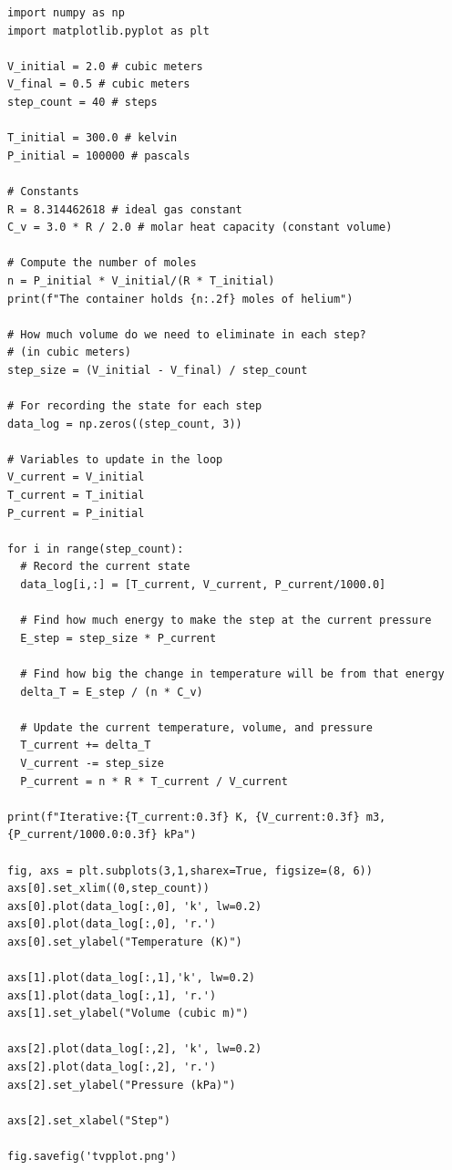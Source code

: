 \begin{verbatim}
import numpy as np
import matplotlib.pyplot as plt

V_initial = 2.0 # cubic meters
V_final = 0.5 # cubic meters
step_count = 40 # steps

T_initial = 300.0 # kelvin
P_initial = 100000 # pascals

# Constants
R = 8.314462618 # ideal gas constant
C_v = 3.0 * R / 2.0 # molar heat capacity (constant volume)

# Compute the number of moles
n = P_initial * V_initial/(R * T_initial) 
print(f"The container holds {n:.2f} moles of helium")

# How much volume do we need to eliminate in each step? 
# (in cubic meters)
step_size = (V_initial - V_final) / step_count

# For recording the state for each step
data_log = np.zeros((step_count, 3))

# Variables to update in the loop
V_current = V_initial
T_current = T_initial
P_current = P_initial

for i in range(step_count):
  # Record the current state
  data_log[i,:] = [T_current, V_current, P_current/1000.0]

  # Find how much energy to make the step at the current pressure
  E_step = step_size * P_current

  # Find how big the change in temperature will be from that energy
  delta_T = E_step / (n * C_v)

  # Update the current temperature, volume, and pressure
  T_current += delta_T
  V_current -= step_size
  P_current = n * R * T_current / V_current

print(f"Iterative:{T_current:0.3f} K, {V_current:0.3f} m3, {P_current/1000.0:0.3f} kPa")

fig, axs = plt.subplots(3,1,sharex=True, figsize=(8, 6))
axs[0].set_xlim((0,step_count))
axs[0].plot(data_log[:,0], 'k', lw=0.2)
axs[0].plot(data_log[:,0], 'r.')
axs[0].set_ylabel("Temperature (K)")

axs[1].plot(data_log[:,1],'k', lw=0.2)
axs[1].plot(data_log[:,1], 'r.')
axs[1].set_ylabel("Volume (cubic m)")

axs[2].plot(data_log[:,2], 'k', lw=0.2)
axs[2].plot(data_log[:,2], 'r.')
axs[2].set_ylabel("Pressure (kPa)")

axs[2].set_xlabel("Step")

fig.savefig('tvpplot.png')
\end{verbatim}

